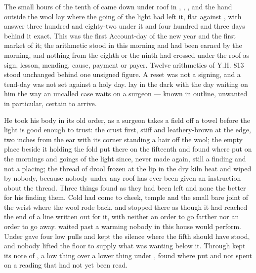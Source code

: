 
The small hours of the tenth of  came down under  roof in , , , and the hand outside the wool lay where the going of the light had left it, flat against , with answer three hundred and eighty-two under it and four hundred and three days behind it exact. This was the first Account-day of the new year and the first market of it; the arithmetic stood in this morning and had been earned by the morning, and nothing from the eighth or the ninth had crossed under the roof as sign, lesson, mending, cause, payment or payer. Twelve arithmetics of Y.H. 813 stood unchanged behind one unsigned figure. A reset was not a signing, and a tend-day was not set against a holy day.  lay in the dark with the day waiting on him the way an uncalled case waits on a surgeon --- known in outline, unwanted in particular, certain to arrive.

He took his body in its old order, as a surgeon takes a field off a towel before the light is good enough to trust: the crust first, stiff and leathery-brown at the edge, two inches from the ear with its corner standing a hair off the wool; the empty place beside it holding the fold put there on the fifteenth and found where put on the mornings and goings of the light since, never made again, still a finding and not a placing; the thread of drool frozen at the lip in the dry kiln heat and wiped by nobody, because nobody under any roof has ever been given an instruction about the thread. Three things found as they had been left and none the better for his finding them. Cold had come to cheek, temple and the small bare joint of the wrist where the wool rode back, and stopped there as though it had reached the end of a line written out for it, with neither an order to go farther nor an order to go away.  waited past a warming nobody in this house would perform. Under   gave four low pulls and kept the silence where the fifth should have stood, and nobody lifted the floor to supply what was wanting below it. Through   kept its note of , a low thing over a lower thing under , found where put and not spent on a reading that had not yet been read.

